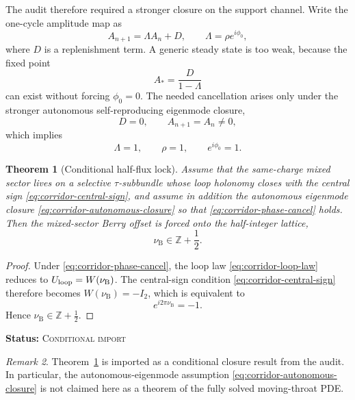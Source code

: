 \documentclass[11pt]{article}
\theoremstyle{plain}
\newtheorem{theorem}{Theorem}[section]
\theoremstyle{definition}
\theoremstyle{remark}
\newtheorem{remark}[theorem]{Remark}
\newcommand{\statusConditional}{\textsc{Conditional import}}
\newcommand{\claimstatus}[1]{\par\smallskip\noindent\textbf{Status:} #1\par\smallskip}
\newcommand{\nuB}{\nu_{\mathrm{B}}}
\begin{document}
The audit therefore required a stronger closure on the support channel. Write the one-cycle amplitude map as
\begin{equation}
A_{n+1}=\Lambda A_n + D,
\qquad
\Lambda=\rho e^{i\phi_0},
\label{eq:corridor-cycle-map}
\end{equation}
where $D$ is a replenishment term. A generic steady state is too weak, because the fixed point
\begin{equation}
A_* = \frac{D}{1-\Lambda}
\label{eq:corridor-steady-fixed-point}
\end{equation}
can exist without forcing $\phi_0=0$. The needed cancellation arises only under the stronger autonomous self-reproducing eigenmode closure,
\begin{equation}
D=0,
\qquad
A_{n+1}=A_n\neq0,
\label{eq:corridor-autonomous-closure}
\end{equation}
which implies
\begin{equation}
\Lambda=1,
\qquad
\rho=1,
\qquad
e^{i\phi_0}=1.
\label{eq:corridor-phase-cancel}
\end{equation}

\begin{theorem}[Conditional half-flux lock]\label{thm:corridor-half-flux-lock}
Assume that the same-charge mixed sector lives on a selective $\tau$-subbundle whose loop holonomy closes with the central sign \cref{eq:corridor-central-sign}, and assume in addition the autonomous eigenmode closure \cref{eq:corridor-autonomous-closure} so that \cref{eq:corridor-phase-cancel} holds. Then the mixed-sector Berry offset is forced onto the half-integer lattice,
\begin{equation}
\nuB\in\mathbb Z+\frac12.
\label{eq:corridor-half-flux-lock}
\end{equation}
\end{theorem}
\begin{proof}
Under \cref{eq:corridor-phase-cancel}, the loop law \cref{eq:corridor-loop-law} reduces to $U_{\rm loop}=W(\nuB)$. The central-sign condition \cref{eq:corridor-central-sign} therefore becomes $W(\nuB)=-I_2$, which is equivalent to
\[
 e^{i2\pi\nuB}=-1.
\]
Hence $\nuB\in\mathbb Z+\tfrac12$.
\end{proof}
\claimstatus{\statusConditional}

\begin{remark}
Theorem~\ref{thm:corridor-half-flux-lock} is imported as a conditional closure result from the audit. In particular, the autonomous-eigenmode assumption \cref{eq:corridor-autonomous-closure} is not claimed here as a theorem of the fully solved moving-throat PDE.
\end{remark}
\end{document}

